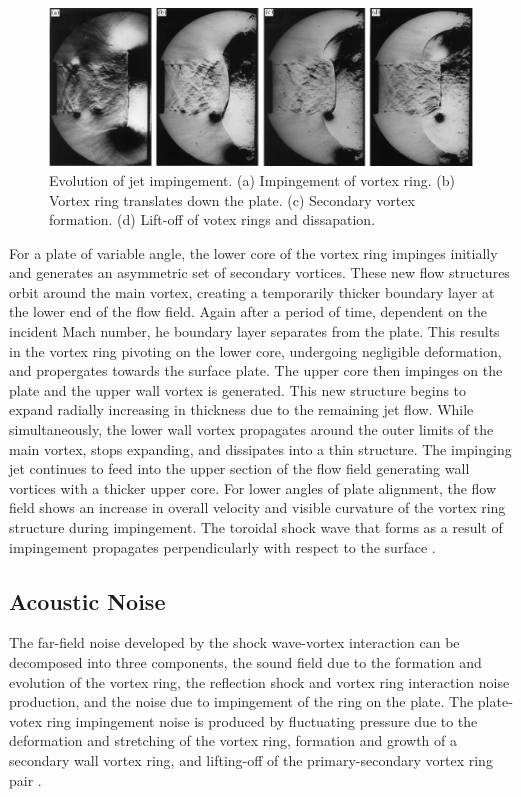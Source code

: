 \begin{figure}[h] 
	\centering
	\includegraphics[width=1\textwidth]{fig4.PNG} 
	\caption{Evolution of jet impingement. (a) Impingement of vortex ring. (b) Vortex ring translates down the plate. (c) Secondary vortex formation. (d) Lift-off of votex rings and dissapation. \citep{szumowski2000starting}}
	\label{fig:4}
\end{figure}
For a plate of variable angle, the lower core of the vortex ring impinges initially and generates an asymmetric set of secondary vortices. These new flow structures orbit around the main vortex, creating a temporarily thicker boundary layer at the lower end of the flow field. Again after a period of time, dependent on the incident Mach number, he boundary layer separates from the plate. This results in the vortex ring pivoting on the lower core, undergoing negligible deformation, and propergates towards the surface plate. The upper core then impinges on the plate and the upper wall vortex is generated. This new structure begins to expand radially increasing in thickness due to the remaining jet flow. While simultaneously, the lower wall vortex propagates around the outer limits of the main vortex, stops expanding, and dissipates into a thin structure. The impinging jet continues to feed into the upper section of the flow field generating wall vortices with a thicker upper core. For lower angles of plate alignment, the flow field shows an increase in overall velocity and visible curvature of the vortex ring structure during impingement. The toroidal shock wave that forms as a result of impingement propagates perpendicularly with respect to the surface \citep{mariani2013head}.  

\subsection{Acoustic Noise}
The far-field noise developed by the shock wave-vortex interaction can be decomposed into three components, the sound field due to the formation and evolution of the vortex ring, the reflection shock and vortex ring interaction noise production, and the noise due to impingement of the ring on the plate. The plate-votex ring impingement noise is produced by fluctuating pressure due to the deformation and stretching of the vortex ring, formation and growth of a secondary wall vortex ring, and lifting-off of the primary-secondary vortex ring pair \cite{murugan2010characteristics}.


